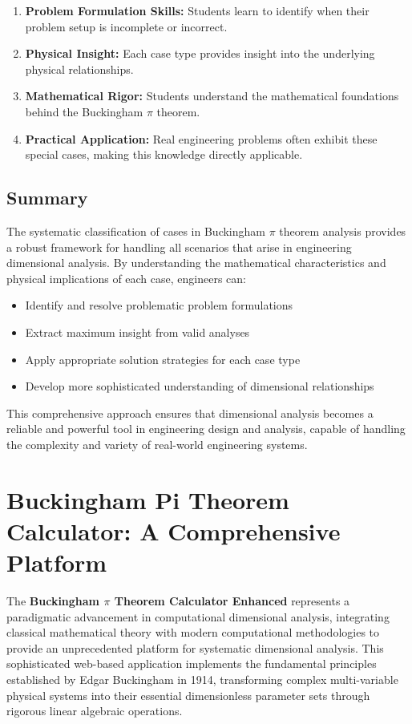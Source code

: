 \documentclass[
	11pt, %
	fleqn, %
	a4paper, %
]{LegrandOrangeBook}
\begin{document}
\begin{enumerate}
    \item \textbf{Problem Formulation Skills:} Students learn to identify when their problem setup is incomplete or incorrect.
    \item \textbf{Physical Insight:} Each case type provides insight into the underlying physical relationships.
    \item \textbf{Mathematical Rigor:} Students understand the mathematical foundations behind the Buckingham $\pi$ theorem.
    \item \textbf{Practical Application:} Real engineering problems often exhibit these special cases, making this knowledge directly applicable.
\end{enumerate}

\subsection{Summary}

The systematic classification of cases in Buckingham $\pi$ theorem analysis provides a robust framework for handling all scenarios that arise in engineering dimensional analysis. By understanding the mathematical characteristics and physical implications of each case, engineers can:

\begin{itemize}
    \item Identify and resolve problematic problem formulations
    \item Extract maximum insight from valid analyses
    \item Apply appropriate solution strategies for each case type
    \item Develop more sophisticated understanding of dimensional relationships
\end{itemize}

This comprehensive approach ensures that dimensional analysis becomes a reliable and powerful tool in engineering design and analysis, capable of handling the complexity and variety of real-world engineering systems.


\section{Buckingham Pi Theorem Calculator: A Comprehensive Platform}

The \textbf{Buckingham $\pi$ Theorem Calculator Enhanced} represents a paradigmatic advancement in computational dimensional analysis, integrating classical mathematical theory with modern computational methodologies to provide an unprecedented platform for systematic dimensional analysis. This sophisticated web-based application implements the fundamental principles established by Edgar Buckingham in 1914, transforming complex multi-variable physical systems into their essential dimensionless parameter sets through rigorous linear algebraic operations.
\end{document}
